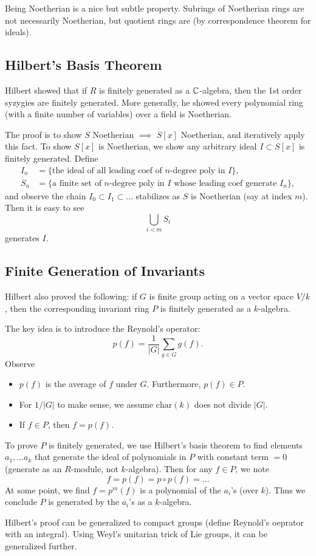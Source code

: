 Being Noetherian is a nice but subtle property. Subrings of Noetherian rings are not necessarily Noetherian, but quotient rings are (by correspondence theorem for ideals).

\subsection{Hilbert's Basis Theorem}
Hilbert showed that if $R$ is finitely generated as a ${\mathbb C}$-algebra, then the 1st order syzygies are finitely generated. More generally, he showed every polynomial ring (with a finite number of variables) over a field is Noetherian.

The proof is to show $S$ Noetherian $\implies$ $S[x]$ Noetherian, and iteratively apply this fact. To show $S[x]$ is Noetherian, we show any arbitrary ideal $I \subset S[x]$ is finitely generated. Define
\[
    \begin{split}
        I_n &= \{\text{the ideal of all leading coef of $n$-degree poly in } I \},\\
        S_n &= \{\text{a finite set of $n$-degree poly in $I$ whose leading coef generate } I_n \},
    \end{split}
\]
and observe the chain $I_0 \subset I_1 \subset \dots$ stabilizes as $S$ is Noetherian (say at index $m$). Then it is easy to see
\[
    \bigcup_{i < m} S_i
\]
generates $I$.

\subsection{Finite Generation of Invariants}
Hilbert also proved the following: if $G$ is finite group acting on a vector space $V/k$, then the corresponding invariant ring $P$ is finitely generated as a $k$-algebra.

The key idea is to introduce the Reynold's operator:
\[
    p(f) = \frac{1}{|G|} \sum_{g \in G} g(f).
\]
Observe
\begin{itemize}
    \item $p(f)$ is the average of $f$ under $G$. Furthermore, $p(f) \in P$.
    \item For $1/|G|$ to make sense, we assume $\text{char}(k)$ does not divide $|G|$.
    \item If $f \in P$, then $f = p(f)$.
\end{itemize}
To prove $P$ is finitely generated, we use Hilbert's basis theorem to find elements $a_1, \dots a_k$ that generate the ideal of polynomials in $P$ with constant term $ = 0$ (generate as an $R$-module, not $k$-algebra). Then for any $f \in P$, we note
\[
    f = p(f) = p \circ p(f) = \dots
\]
At some point, we find $f = p^m(f)$ is a polynomial of the $a_i$'s (over $k$). Thus we conclude $P$ is generated by the $a_i$'s as a $k$-algebra.

Hilbert's proof can be generalized to compact groups (define Reynold's oeprator with an integral). Using Weyl's unitarian trick of Lie groups, it can be generalized further.
